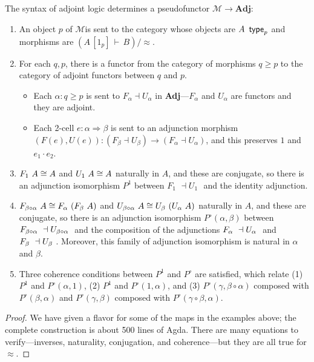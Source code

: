 \documentclass{drl-common/llncs}
\newcommand{\M}{\ensuremath{\mathcal{M}}}
\newcommand{\la}{\ensuremath{\dashv}}
\newcommand{\tc}[2]{\ensuremath{#1 \Rightarrow #2}}
\newcommand{\Adj}{\textbf{Adj}}
\newcommand\compo[2]{\ensuremath{#1 \circ #2}}
\newcommand\compv[2]{\ensuremath{#1 \cdot #2}}
\renewcommand\wftp[2]{\ensuremath{#1 \,\,\, \dsd{type}_{#2}}}
\newcommand\F[2]{\ensuremath{F_{#1} \,\, #2}}
\newcommand\U[2]{\ensuremath{U_{#1} \,\, #2}}
\newcommand\seq[3]{\ensuremath{#1 \, [ #2 ] \, \vdash \, #3}}
\newcommand\ap[2]{\ensuremath{#1 \approx #2}}
\begin{document}
\begin{theorem}
The syntax of adjoint logic determines a pseudofunctor $\M \to \Adj$:
\begin{enumerate}
\item An object $p$ of \M is sent to the category whose objects are
  \wftp{A}{p} and morphisms are $(\seq{A}{1_p}{B})/\ap{}{}$.
\item For each $q,p$, there is a functor from the category of morphisms
  $q \ge p$ to the category of adjoint functors between $q$ and $p$.
  \begin{itemize}
  \item 
  Each $\alpha : q \ge p$ is sent to $F_\alpha \la U_\alpha$ in
  \Adj---$F_\alpha$ and $U_\alpha$ are functors and they are adjoint.

  \item Each 2-cell $e : \tc{\alpha}{\beta}$ is sent to an adjunction
    morphism $(F(e),U(e)) : (F_\beta \la U_\beta) \to (F_\alpha \la
    U_\alpha)$, and this preserves $1$ and $\compv{e_1}{e_2}$.
  \end{itemize}

\item $\F 1 A \iso A$ and $\U 1 A \iso A$ naturally in $A$, and these
  are conjugate, so there is an adjunction isomorphism $P^1$ between $\F 1 {}
  \la \U 1 {}$ and the identity adjunction.

\item $\F {\compo{\beta}{\alpha}} A \iso \F \alpha {(\F \beta A)}$ and
  $\U {\compo{\beta}{\alpha}} A \iso \U \beta {(\U \alpha A)}$ naturally
  in $A$, and these are conjugate, so there is an adjunction isomorphism
  $P^{\circ}(\alpha,\beta)$ between $\F {\compo{\beta}{\alpha}} \la \U
  {\compo{\beta}{\alpha}}$ and the composition of the adjunctions $\F
  {\alpha} \la \U {\alpha}$ and $\F {\beta} \la \U {\beta}$.  Moreover,
  this family of adjunction isomorphism is natural in $\alpha$ and
  $\beta$.

\item Three coherence conditions between $P^1$ and $P^\circ$ are
  satisfied, which relate (1) $P^1$ and $P^\circ(\alpha,1)$,
  (2) $P^1$ and $P^\circ(1,\alpha)$, and (3) 
  $P^\circ(\gamma,\compo{\beta}{\alpha})$ composed with
  $P^\circ(\beta,\alpha)$ and $P^\circ(\gamma,\beta)$ composed with
  $P^\circ(\compo{\gamma}{\beta},\alpha)$.  
\end{enumerate}
\end{theorem}

\begin{proof}
We have given a flavor for some of the maps in the examples above; the
complete construction is about 500 lines of Agda.  There are many
equations to verify---inverses, naturality, conjugation, and
coherence---but they are all true for \ap{}{}.
\end{proof}
\end{document}
